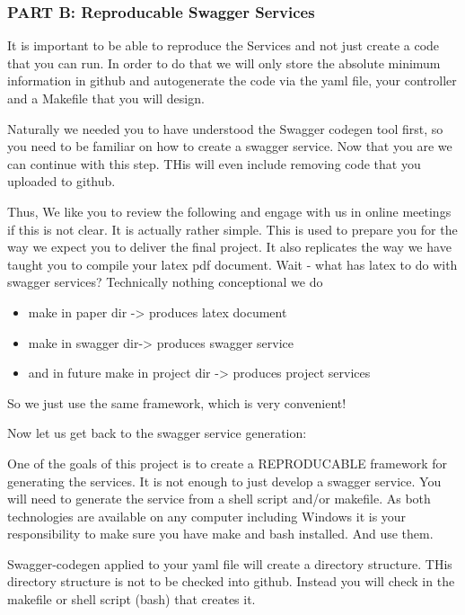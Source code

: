 \subsubsection{PART B: Reproducable Swagger Services}

\begin{exercise}
It is important to be able to reproduce the Services and not just
create a code that you can run. In order to do that we will only store
the absolute minimum information in github and autogenerate the code
via the yaml file, your controller and a Makefile that you will
design.

Naturally we needed you to have understood the Swagger codegen tool
first, so you need to be familiar on how to create a swagger service.
Now that you are we can continue with this step. THis will even
include removing code that you uploaded to github.

Thus, We like you to review the following and engage with us in online
meetings if this is not clear. It is actually rather simple. This is
used to prepare you for the way we expect you to deliver the final
project. It also replicates the way we have taught you to compile your
latex pdf document. Wait - what has latex to do with swagger services?
Technically nothing conceptional we do

 
\begin{itemize}
\item make in paper dir -> produces latex document

\item make in swagger dir-> produces swagger service

\item and in future make in project dir -> produces project services
\end{itemize}
 

So we just use the same framework, which is very convenient!

Now let us get back to the swagger service generation:
 
One of the goals of this project is to create a REPRODUCABLE framework
for generating the services. It is not enough to just develop a
swagger service. You will need to generate the service from a shell
script and/or makefile. As both technologies are available on any
computer including Windows it is your responsibility to make sure you
have make and bash installed. And use them.

Swagger-codegen applied to your yaml file will create a directory
structure. THis directory structure is not to be checked into
github. Instead you will check in the makefile or shell script (bash)
that creates it.


\end{exercise}
